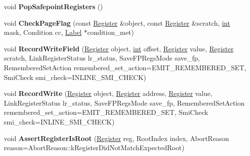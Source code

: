 \begin{DoxyCompactItemize}
\mbox{\label{classv8_1_1internal_1_1MacroAssembler_accf004371b050ef53eb57724f4d8d8b1}} 
void {\bfseries Pop\+Safepoint\+Registers} ()
\item 
\mbox{\label{classv8_1_1internal_1_1MacroAssembler_a363e0a65837803268d36a4c51a74df39}} 
void {\bfseries Check\+Page\+Flag} (const \mbox{\hyperlink{classv8_1_1internal_1_1Register}{Register}} \&object, const \mbox{\hyperlink{classv8_1_1internal_1_1Register}{Register}} \&scratch, \mbox{\hyperlink{classint}{int}} mask, Condition cc, \mbox{\hyperlink{classv8_1_1internal_1_1Label}{Label}} $\ast$condition\+\_\+met)
\item 
\mbox{\label{classv8_1_1internal_1_1MacroAssembler_a612d90391b176f5d40e0349ed4a82439}} 
void {\bfseries Record\+Write\+Field} (\mbox{\hyperlink{classv8_1_1internal_1_1Register}{Register}} object, \mbox{\hyperlink{classint}{int}} offset, \mbox{\hyperlink{classv8_1_1internal_1_1Register}{Register}} value, \mbox{\hyperlink{classv8_1_1internal_1_1Register}{Register}} scratch, Link\+Register\+Status lr\+\_\+status, Save\+F\+P\+Regs\+Mode save\+\_\+fp, Remembered\+Set\+Action remembered\+\_\+set\+\_\+action=E\+M\+I\+T\+\_\+\+R\+E\+M\+E\+M\+B\+E\+R\+E\+D\+\_\+\+S\+ET, Smi\+Check smi\+\_\+check=I\+N\+L\+I\+N\+E\+\_\+\+S\+M\+I\+\_\+\+C\+H\+E\+CK)
\item 
\mbox{\label{classv8_1_1internal_1_1MacroAssembler_aafeb4e1da90d61d024029e1f75ca4490}} 
void {\bfseries Record\+Write} (\mbox{\hyperlink{classv8_1_1internal_1_1Register}{Register}} object, \mbox{\hyperlink{classv8_1_1internal_1_1Register}{Register}} address, \mbox{\hyperlink{classv8_1_1internal_1_1Register}{Register}} value, Link\+Register\+Status lr\+\_\+status, Save\+F\+P\+Regs\+Mode save\+\_\+fp, Remembered\+Set\+Action remembered\+\_\+set\+\_\+action=E\+M\+I\+T\+\_\+\+R\+E\+M\+E\+M\+B\+E\+R\+E\+D\+\_\+\+S\+ET, Smi\+Check smi\+\_\+check=I\+N\+L\+I\+N\+E\+\_\+\+S\+M\+I\+\_\+\+C\+H\+E\+CK)
\item 
\mbox{\label{classv8_1_1internal_1_1MacroAssembler_a975f350df97bb6a202a7b36d5de2b59f}} 
void {\bfseries Assert\+Register\+Is\+Root} (\mbox{\hyperlink{classv8_1_1internal_1_1Register}{Register}} reg, Root\+Index index, Abort\+Reason reason=Abort\+Reason\+::k\+Register\+Did\+Not\+Match\+Expected\+Root)

\end{DoxyCompactItemize}
